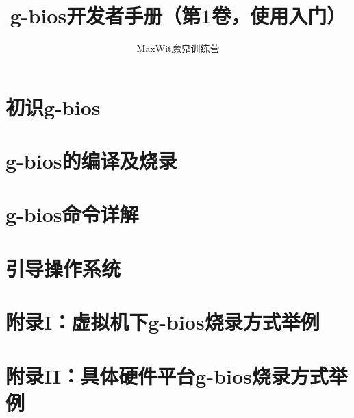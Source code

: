 \documentclass[a4paper,11pt,oneside]{book}
\title{g-bios开发者手册（第1卷，使用入门）}
\author{MaxWit魔鬼训练营}
\begin{document}
\maketitle

\frontmatter
\tableofcontents

\mainmatter

\chapter{初识g-bios}


\chapter{g-bios的编译及烧录}




\chapter{g-bios命令详解}


\chapter{引导操作系统}


\chapter{附录I：虚拟机下g-bios烧录方式举例}


\chapter{附录II：具体硬件平台g-bios烧录方式举例}

\end{document}
